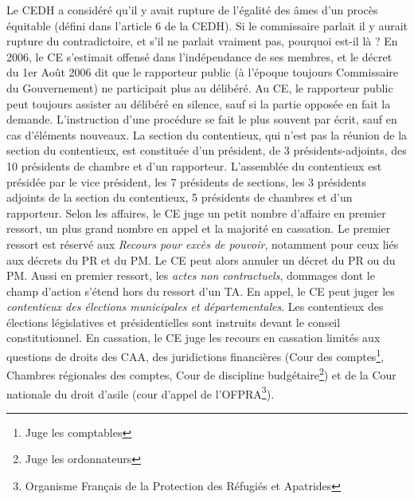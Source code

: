\documentclass[math]{cours}
\begin{document}
Le CEDH a considéré qu'il y avait rupture de l'égalité des âmes d'un procès équitable (défini dans l'article 6 de la CEDH).
Si le commissaire parlait il y aurait rupture du contradictoire, et s'il ne parlait vraiment pas, pourquoi est-il là ?
En 2006, le CE s'estimait offensé dans l'indépendance de ses membres, et le décret du 1er Août 2006 dit que le rapporteur public (à l'époque toujours Commissaire du Gouvernement) ne participait plus au délibéré.
Au CE, le rapporteur public peut toujours assister au délibéré en silence, sauf si la partie opposée en fait la demande.
L'instruction d'une procédure se fait le plus souvent par écrit, sauf en cas d'éléments nouveaux.
La section du contentieux, qui n'est pas la réunion de la section du contentieux, est constituée d'un président, de 3 présidents-adjoints, des 10 présidents de chambre et d'un rapporteur.
L'assemblée du contentieux est présidée par le vice président, les 7 présidents de sections, les 3 présidents adjoints de la section du contentieux, 5 présidents de chambres et d'un rapporteur.
Selon les affaires, le CE juge un petit nombre d'affaire en premier ressort, un plus grand nombre en appel et la majorité en cassation.
Le premier ressort est réservé aux \textit{Recours pour excès de pouvoir}, notamment pour ceux liés aux décrets du PR et du PM.
Le CE peut alors annuler un décret du PR ou du PM.
Aussi en premier ressort, les \emph{actes non contractuels}, dommages dont le champ d'action s'étend hors du ressort d'un TA.
En appel, le CE peut juger les \emph{contentieux des élections municipales et départementales}.
Les contentieux des élections législatives et présidentielles sont instruits devant le conseil constitutionnel.
En cassation, le CE juge les recours en cassation limités aux questions de droits des CAA, des juridictions financières (Cour des comptes\footnote{Juge les comptables}, Chambres régionales des comptes, Cour de discipline budgétaire\footnote{Juge les ordonnateurs}) et de la Cour nationale du droit d'asile (cour d'appel de l'OFPRA\footnote{Organisme Français de la Protection des Réfugiés et Apatrides}).
\end{document}
